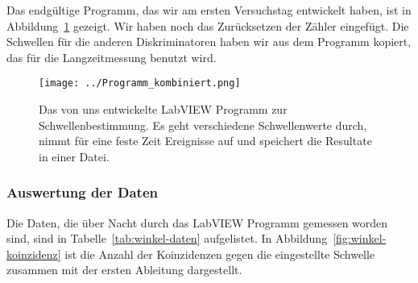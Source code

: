 \documentclass[11pt, ngerman, fleqn, DIV=15, headinclude, BCOR=2cm]{scrreprt}
\begin{document}
Das endgültige Programm, das wir am ersten Versuchstag entwickelt haben, ist in
Abbildung~\ref{fig:labview-programm} gezeigt. Wir haben noch das Zurücksetzen
der Zähler eingefügt. Die Schwellen für die anderen Diskriminatoren haben wir
aus dem Programm kopiert, das für die Langzeitmessung benutzt wird.

\begin{landscape}
    \begin{figure}[htbp]
        \centering
        \texttt{[image: ../Programm\_kombiniert.png]}
        \caption{%
            Das von uns entwickelte LabVIEW Programm zur Schwellenbestimmung.
            Es geht verschiedene Schwellenwerte durch, nimmt für eine feste
            Zeit Ereignisse auf und speichert die Resultate in einer Datei.
        }
        \label{fig:labview-programm}
    \end{figure}
\end{landscape}

\subsubsection{Auswertung der Daten}

Die Daten, die über Nacht durch das LabVIEW Programm gemessen worden sind, sind
in Tabelle~\ref{tab:winkel-daten} aufgelistet. In
Abbildung~\ref{fig:winkel-koinzidenz} ist die Anzahl der Koinzidenzen gegen die
eingestellte Schwelle zusammen mit der ersten Ableitung dargestellt.
\end{document}
